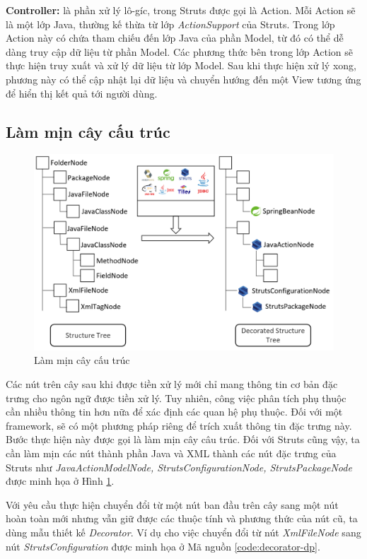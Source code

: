 \documentclass[12pt]{report}
\begin{document}
\textbf{Controller:} là phần xử lý lô-gíc, trong Struts được gọi là Action. Mỗi Action sẽ là một lớp Java, thường kế thừa từ lớp \textit{ActionSupport} của Struts. Trong lớp Action này có chứa tham chiếu đến lớp Java của phần Model, từ đó có thể dễ dàng truy cập dữ liệu từ phần Model. Các phương thức bên trong lớp Action sẽ thực hiện truy xuất và xử lý dữ liệu từ lớp Model. Sau khi thực hiện xử lý xong, phương này có thể cập nhật lại dữ liệu và chuyển hướng đến một View tương ứng để hiển thị kết quả tới người dùng.

\subsection{Làm mịn cây cấu trúc}

\begin{figure}[h]
	\centering
	\includegraphics[scale=0.4]{lam-min}
	\caption{Làm mịn cây cấu trúc}
	\label{fig:lam-min}
\end{figure}

Các nút trên cây sau khi được tiền xử lý mới chỉ mang thông tin cơ bản đặc trưng cho ngôn ngữ được tiền xử lý. Tuy nhiên, công việc phân tích phụ thuộc cần nhiều thông tin hơn nữa để xác định các quan hệ phụ thuộc. Đối với một framework, sẽ có một phương pháp riêng để trích xuất thông tin đặc trưng này. Bước thực hiện này được gọi là làm mịn cây câu trúc. Đối với Struts cũng vậy, ta cần làm mịn các nút thành phần Java và XML thành các nút đặc trưng của Struts như \textit{JavaActionModelNode, StrutsConfigurationNode, StrutsPackageNode} được minh họa ở Hình \ref{fig:lam-min}.

Với yêu cầu thực hiện chuyển đổi từ một nút ban đầu trên cây sang một nút hoàn toàn mới nhưng vẫn giữ được các thuộc tính và phương thức của nút cũ, ta dùng mẫu thiết kế \textit{Decorator}. Ví dụ cho việc chuyển đổi từ nút \textit{XmlFileNode} sang nút \textit{StrutsConfiguration} được minh họa ở Mã nguồn \ref{code:decorator-dp}.
\end{document}
